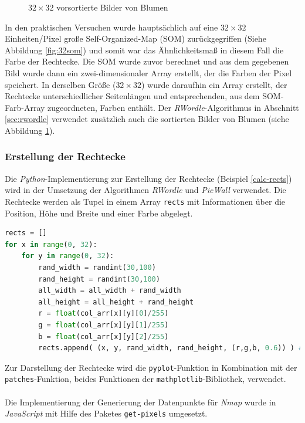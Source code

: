 \documentclass[12pt, ngerman, utf8]{article}
\begin{document}
\begin{figure}[h]
\begin{minipage}{.55\textwidth}
  \caption{$32\times32$ vorsortierte Bilder von Blumen}
  \label{fig:32flowers}
\end{minipage}
\end{figure}
In den praktischen Versuchen wurde hauptsächlich auf eine  $32\times32$ Einheiten/Pixel große Self-Organized-Map (SOM) zurückgegriffen (Siehe Abbildung \ref{fig:32som}) und somit war das Ähnlichkeitsmaß in diesem Fall die Farbe der Rechtecke. 
Die SOM wurde zuvor berechnet und aus dem gegebenen Bild wurde dann ein zwei-dimensionaler Array erstellt, der die Farben der Pixel speichert. In derselben Größe ($32\times32$) wurde daraufhin ein Array erstellt, der Rechtecke  unterschiedlicher Seitenlängen und entsprechenden, aus dem SOM-Farb-Array zugeordneten, Farben enthält. Der \emph{RWordle}-Algorithmus in Abschnitt \ref{sec:rwordle} verwendet zusätzlich auch die sortierten Bilder von Blumen (siehe Abbildung \ref{fig:32flowers}).

\subsubsection{Erstellung der Rechtecke}
Die \emph{Python}-Implementierung zur Erstellung der Rechtecke (Beispiel \ref{calc-rects}) wird in der Umsetzung der Algorithmen \emph{RWordle} und \emph{PicWall} verwendet. Die Rechtecke werden als Tupel in einem Array \texttt{rects} mit Informationen über die Position, Höhe und Breite und einer Farbe abgelegt.\\
\begin{lstlisting}[language=Python, caption={Erstellung der Rechtecke; \texttt{col\_arr} enthält die Farben aus der SOM},label=calc-rects]
rects = []
for x in range(0, 32):
    for y in range(0, 32):
        rand_width = randint(30,100)
        rand_height = randint(30,100)
        all_width = all_width + rand_width
        all_height = all_height + rand_height
        r = float(col_arr[x][y][0]/255)
        g = float(col_arr[x][y][1]/255)
        b = float(col_arr[x][y][2]/255)
        rects.append( (x, y, rand_width, rand_height, (r,g,b, 0.6)) ) #alpha 0.6
\end{lstlisting}
Zur Darstellung der Rechtecke wird die \texttt{pyplot}-Funktion in Kombination mit der \texttt{patches}-Funktion, beides Funktionen der \texttt{mathplotlib}-Bibliothek, verwendet.\\\\
Die Implementierung der Generierung der Datenpunkte für \textit{Nmap} wurde in \emph{JavaScript} mit Hilfe des Paketes \texttt{get-pixels} \cite{npm-get-pixels} umgesetzt. 
\end{document}
